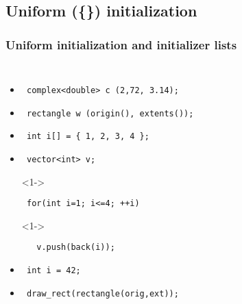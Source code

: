 \subsection{Uniform (\{\}) initialization} \lyxframeend{}

\begin{frame}[fragile]
\frametitle{Uniform initialization and initializer lists}

\begin{columns}[t]
\begin{itemize}
\item<1->{\scriptsize\begin{verbatim} complex<double> c (2,72, 3.14); \end{verbatim}}
\item<1->{\scriptsize\begin{verbatim} rectangle w (origin(), extents());\end{verbatim}}


\item<1->{\scriptsize\begin{verbatim} int i[] = { 1, 2, 3, 4 };  \end{verbatim}}
\item<1->{\scriptsize\begin{verbatim} vector<int> v;  \end{verbatim}}
\item[]<1->{\scriptsize\begin{verbatim} for(int i=1; i<=4; ++i)   \end{verbatim}}
\item[]<1->{\scriptsize\begin{verbatim}   v.push(back(i)); \end{verbatim}}
\item<3->{\scriptsize\begin{verbatim} int i = 42;  \end{verbatim}}
\item<4->{\scriptsize\begin{verbatim} draw_rect(rectangle(orig,ext));  \end{verbatim}}
\end{itemize}


\end{columns}
\end{frame}
